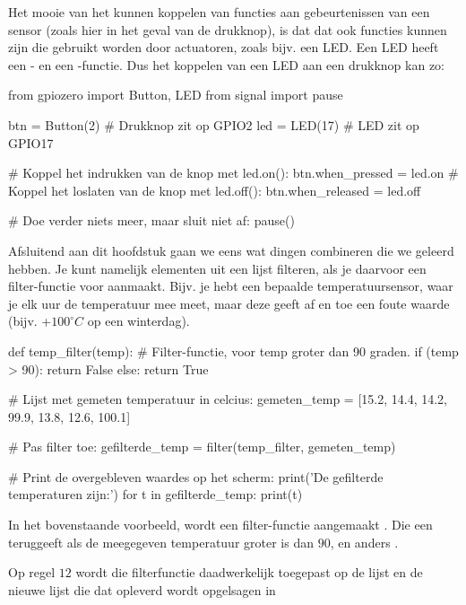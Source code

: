 \begin{remark}
Het mooie van het kunnen koppelen van functies aan gebeurtenissen van een sensor (zoals hier in het geval van de drukknop), is dat dat ook functies kunnen zijn die gebruikt worden door actuatoren, zoals bijv. een LED. Een LED heeft een - en een -functie. Dus het koppelen van een LED aan een drukknop kan zo:

\begin{python}
from gpiozero import Button, LED
from signal import pause

btn = Button(2)  # Drukknop zit op GPIO2
led = LED(17)    # LED zit op GPIO17

# Koppel het indrukken van de knop met led.on():
btn.when_pressed = led.on    
# Koppel het loslaten van de knop met led.off():
btn.when_released = led.off  

# Doe verder niets meer, maar sluit niet af:
pause()                      
\end{python}
\end{remark}

\newpage
Afsluitend aan dit hoofdstuk gaan we eens wat dingen combineren die we geleerd hebben. Je kunt namelijk elementen uit een lijst filteren, als je daarvoor een filter-functie voor aanmaakt. Bijv. je hebt een bepaalde temperatuursensor, waar je elk uur de temperatuur mee meet, maar deze geeft af en toe een foute waarde (bijv. +$100^\circ C$ op een winterdag). 

\begin{python}
def temp_filter(temp):
    # Filter-functie, voor temp groter dan 90 graden.
    if (temp > 90):
        return False
    else:
        return True

# Lijst met gemeten temperatuur in celcius:  
gemeten_temp = [15.2, 14.4, 14.2, 99.9, 13.8, 12.6, 100.1]

# Pas filter toe:
gefilterde_temp = filter(temp_filter, gemeten_temp)

# Print de overgebleven waardes op het scherm:
print('De gefilterde temperaturen zijn:')
for t in gefilterde_temp:
    print(t)                    
\end{python}

In het bovenstaande voorbeeld, wordt een filter-functie aangemaakt . Die een  teruggeeft als de meegegeven temperatuur  groter is dan $90$, en anders . \newline

Op regel $12$ wordt die filterfunctie daadwerkelijk toegepast op de lijst  en de nieuwe lijst die dat opleverd wordt opgelsagen in 

